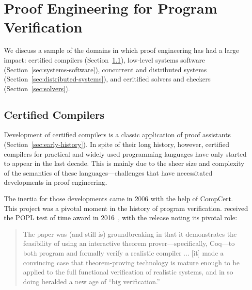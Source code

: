 

\section{Proof Engineering for Program Verification}
\label{sec:app-prog}

We discuss a sample of the domains in which proof engineering has had a large impact:
certified compilers (Section~\ref{sec:verified-compilers}),
low-level systems software (Section~\ref{sec:systems-software}),
concurrent and distributed systems (Section~\ref{sec:distributed-systems}),
and ceritified solvers and checkers (Section~\ref{sec:solvers}).

\subsection{Certified Compilers}
\label{sec:verified-compilers}

Development of certified compilers is a classic application of proof assistants (Section~\ref{sec:early-history}). 
In spite of their long history, however, certified compilers for practical and widely used programming languages have only started to appear in the last
decade. This is mainly due to the sheer size and complexity of the semantics of these languages---challenges that have necessitated 
developments in proof engineering.

The inertia for those developments came in 2006 with the help of CompCert.
This project was a pivotal moment in the history of program verification.
\cite{Leroy:POPL06} received the POPL test of time award in 2016~\citep{popl-time}, with the release noting
its pivotal role:

\begin{quote}
The paper was (and still is) groundbreaking in that it demonstrates the feasibility of using an interactive theorem prover---specifically, Coq---to both program and formally verify a realistic compiler ... [it] made a convincing case that theorem-proving technology is mature enough to be applied to the full functional verification of realistic systems, and in so doing heralded a new age of ``big verification.''
\end{quote} 

